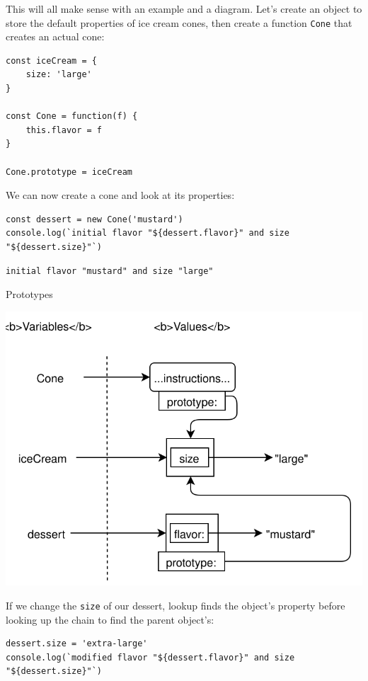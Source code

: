 This will all make sense with an example and a diagram. Let's create an
object to store the default properties of ice cream cones, then create a
function \texttt{Cone} that creates an actual cone:

\begin{verbatim}
const iceCream = {
    size: 'large'
}

const Cone = function(f) {
    this.flavor = f
}

Cone.prototype = iceCream
\end{verbatim}

We can now create a cone and look at its properties:

\begin{verbatim}
const dessert = new Cone('mustard')
console.log(`initial flavor "${dessert.flavor}" and size "${dessert.size}"`)
\end{verbatim}

\begin{verbatim}
initial flavor "mustard" and size "large"
\end{verbatim}

Prototypes

\includegraphics{../../files/legacy-prototype.svg}

If we change the \texttt{size} of our dessert, lookup finds the object's
property before looking up the chain to find the parent object's:

\begin{verbatim}
dessert.size = 'extra-large'
console.log(`modified flavor "${dessert.flavor}" and size "${dessert.size}"`)
\end{verbatim}

